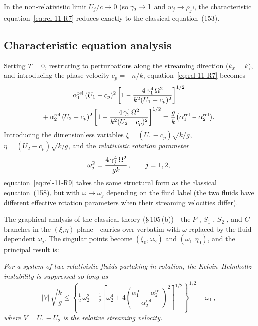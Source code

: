 In the non-relativistic limit $U_{j}/c\to 0$ (so $\gamma_{j}\to 1$ and
$w_{j}\to\rho_{j}$), the characteristic equation~\eqref{eq:rel-11-R7}
reduces exactly to the classical equation~(153).

\subsection{Characteristic equation analysis}
\label{sec:rel-11-105c}

Setting $T=0$, restricting to perturbations along the streaming
direction ($k_{x}=k$), and introducing the phase velocity $c_{p}=-n/k$,
equation~\eqref{eq:rel-11-R7} becomes
\begin{multline}
\label{eq:rel-11-R9}
\alpha_{1}^{\mathrm{rel}}\,(U_{1}-c_{p})^{2}
\left[1-\frac{4\,\gamma_{1}^{4}\,\Omega^{2}}{k^{2}(U_{1}-c_{p})^{2}}
\right]^{1/2}\\
+\,\alpha_{2}^{\mathrm{rel}}\,(U_{2}-c_{p})^{2}
\left[1-\frac{4\,\gamma_{2}^{4}\,\Omega^{2}}{k^{2}(U_{2}-c_{p})^{2}}
\right]^{1/2}
= \frac{g}{k}\bigl(\alpha_{1}^{\mathrm{rel}}-\alpha_{2}^{\mathrm{rel}}\bigr).
\end{multline}
Introducing the dimensionless variables
$\xi=(U_{1}-c_{p})\sqrt{k/g}$, $\eta=(U_{2}-c_{p})\sqrt{k/g}$, and
the \emph{relativistic rotation parameter}
\begin{equation}
\label{eq:rel-11-R10}
\omega_{j}^{2} = \frac{4\,\gamma_{j}^{4}\,\Omega^{2}}{gk}\,,
\qquad j=1,2,
\end{equation}
equation~\eqref{eq:rel-11-R9} takes the same structural form as the
classical equation~(158), but with $\omega\to\omega_{j}$ depending on
the fluid label (the two fluids have different effective rotation
parameters when their streaming velocities differ).

The graphical analysis of the classical theory (\S\,105\,(b))---the
$P$-, $S_{1}$-, $S_{2}$-, and $C$-branches in the
$(\xi,\eta)$-plane---carries over verbatim with $\omega$ replaced by
the fluid-dependent $\omega_{j}$.  The singular points become
$(\xi_{0},\omega_{2})$ and $(\omega_{1},\eta_{0})$, and the principal
result is:

\smallskip
\noindent\textit{For a system of two relativistic fluids partaking in
rotation, the Kelvin--Helmholtz instability is suppressed so long as}
\begin{equation}
\label{eq:rel-11-R11}
\boxed{
|V|\,\sqrt{\frac{k}{g}}
\leqslant
\left\{\tfrac{1}{2}\,\omega_{2}^{2}
+\tfrac{1}{2}\!\left[\omega_{2}^{4}
+4\!\left(\frac{\alpha_{1}^{\mathrm{rel}}
-\alpha_{2}^{\mathrm{rel}}}{\alpha_{2}^{\mathrm{rel}}}
\right)^{\!2}\right]^{1/2}\right\}^{1/2}\!\!-\omega_{1}\,,}
\end{equation}
\textit{where $V=U_{1}-U_{2}$ is the relative streaming velocity.}


